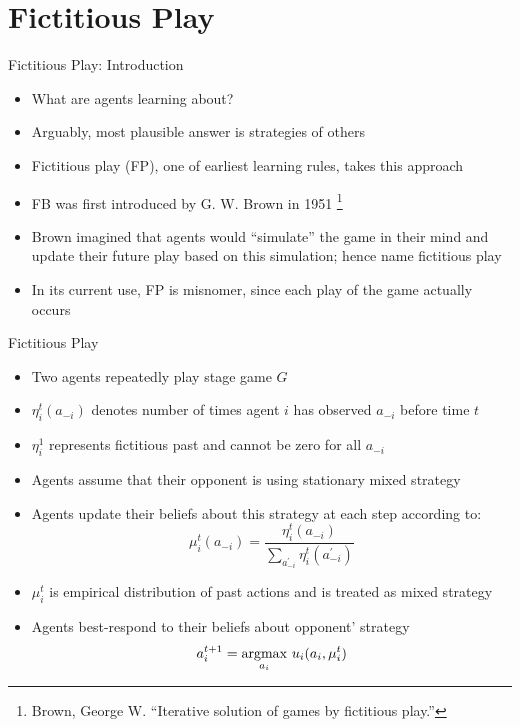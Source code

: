 \documentclass[11pt,aspectratio=169]{beamer}
\begin{document}
  
 \section{Fictitious Play}
  
  \begin{frame}{Fictitious Play: Introduction}
   \begin{itemize}[<+->]
   \setlength{\itemsep}{1.2em}
    \item What are agents learning about?
    \item Arguably, most plausible answer is strategies of others
    \item \alert{Fictitious} play (FP), one of earliest learning rules, takes this approach
    \item FB was first introduced by G. W. Brown in 1951%
    \footnote{Brown, George W. ``Iterative solution of games by fictitious play.''}
    \item Brown imagined that agents would \alert{``simulate''} the game in their mind and update their future play based on this simulation; hence name fictitious play
    \item In its current use, FP is misnomer, since each play of the game actually occurs
   \end{itemize}
  \end{frame}
  
  
  \begin{frame}{Fictitious Play}
   \begin{itemize}[<+->]
    \item Two agents repeatedly play stage game $G$
    \item $\eta_i^t(a_{-i})$ denotes number of times agent $i$ has observed $a_{-i}$ before time $t$
    \item $\eta_i^1$ represents \alert{fictitious past} and cannot be zero for all $a_{-i}$
    \item Agents assume that their opponent is using \alert{stationary mixed strategy}
    \item Agents \alert{update their beliefs} about this strategy at each step according to:
    $$\mu_i^t(a_{-i})=\frac{\eta_i^t(a_{-i})}{\sum_{a_{-i}^\prime}\eta_i^t(a_{-i}^\prime)}$$
    \item $\mu_i^t$ is \alert{empirical distribution} of past actions and is treated as mixed strategy
    \item Agents best-respond to their beliefs about opponent' strategy
    $$a_i^{t+1}=\underset{a_i}{\operatorname*{argmax}}~u_i(a_i,\mu_i^t)$$
   \end{itemize}
  \end{frame}
  
\end{document}
